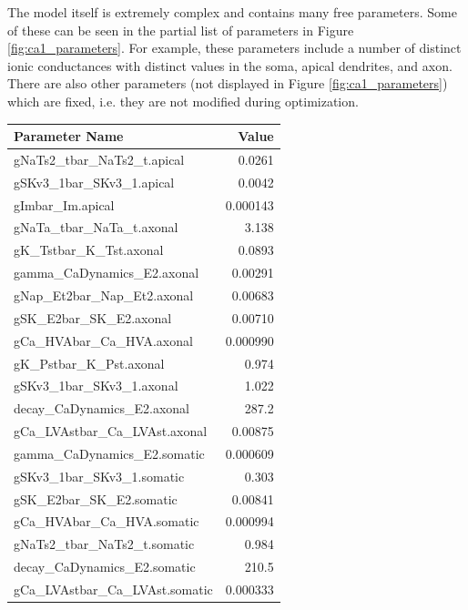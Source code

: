 The model itself is extremely complex and contains many free parameters.
Some of these can be seen in the partial list of parameters in Figure \ref{fig:ca1_parameters}.
For example, these parameters include a number of distinct ionic conductances with distinct values in the soma, apical dendrites, and axon.
There are also other parameters (not displayed in Figure \ref{fig:ca1_parameters}) which are fixed, i.e. they are not modified during optimization.
\begin{table}
\begin{center}
\begin{tabular}{|l|r|}
\toprule
Parameter Name &           Value \\
\midrule
gNaTs2\_tbar\_NaTs2\_t.apical    &    0.0261 \\
gSKv3\_1bar\_SKv3\_1.apical      &    0.0042 \\
gImbar\_Im.apical              &    0.000143 \\
gNaTa\_tbar\_NaTa\_t.axonal      &    3.138 \\
gK\_Tstbar\_K\_Tst.axonal        &    0.0893 \\
gamma\_CaDynamics\_E2.axonal    &    0.00291 \\
gNap\_Et2bar\_Nap\_Et2.axonal    &    0.00683 \\
gSK\_E2bar\_SK\_E2.axonal        &    0.00710 \\
gCa\_HVAbar\_Ca\_HVA.axonal      &    0.000990 \\
gK\_Pstbar\_K\_Pst.axonal        &    0.974 \\
gSKv3\_1bar\_SKv3\_1.axonal      &    1.022 \\
decay\_CaDynamics\_E2.axonal    &  287.2 \\
gCa\_LVAstbar\_Ca\_LVAst.axonal  &    0.00875 \\
gamma\_CaDynamics\_E2.somatic   &    0.000609 \\
gSKv3\_1bar\_SKv3\_1.somatic     &    0.303 \\
gSK\_E2bar\_SK\_E2.somatic       &    0.00841 \\
gCa\_HVAbar\_Ca\_HVA.somatic     &    0.000994 \\
gNaTs2\_tbar\_NaTs2\_t.somatic   &    0.984 \\
decay\_CaDynamics\_E2.somatic   &  210.5 \\
gCa\_LVAstbar\_Ca\_LVAst.somatic &    0.000333 \\
\bottomrule
\end{tabular}
\end{center}



\end{table}
